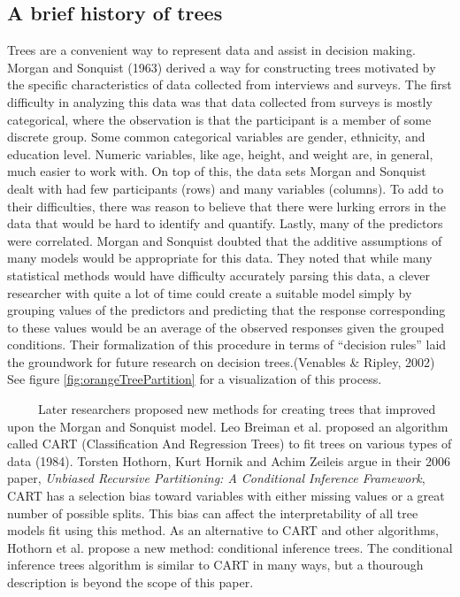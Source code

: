 \documentclass[12pt,twoside]{reedthesis}
\begin{document}
  \subsection{A brief history of trees}\label{a-brief-history-of-trees}
  
  Trees are a convenient way to represent data and assist in decision
  making. Morgan and Sonquist (1963) derived a way for constructing trees
  motivated by the specific characteristics of data collected from
  interviews and surveys. The first difficulty in analyzing this data was
  that data collected from surveys is mostly categorical, where the
  observation is that the participant is a member of some discrete group.
  Some common categorical variables are gender, ethnicity, and education
  level. Numeric variables, like age, height, and weight are, in general,
  much easier to work with. On top of this, the data sets Morgan and
  Sonquist dealt with had few participants (rows) and many variables
  (columns). To add to their difficulties, there was reason to believe
  that there were lurking errors in the data that would be hard to
  identify and quantify. Lastly, many of the predictors were correlated.
  Morgan and Sonquist doubted that the additive assumptions of many models
  would be appropriate for this data. They noted that while many
  statistical methods would have difficulty accurately parsing this data,
  a clever researcher with quite a lot of time could create a suitable
  model simply by grouping values of the predictors and predicting that
  the response corresponding to these values would be an average of the
  observed responses given the grouped conditions. Their formalization of
  this procedure in terms of ``decision rules'' laid the groundwork for
  future research on decision trees.(Venables \& Ripley, 2002) See figure
  \ref{fig:orangeTreePartition} for a visualization of this process.
  
  ~~~~~Later researchers proposed new methods for creating trees that
  improved upon the Morgan and Sonquist model. Leo Breiman et al. proposed
  an algorithm called CART (Classification And Regression Trees) to fit
  trees on various types of data (1984). Torsten Hothorn, Kurt Hornik and
  Achim Zeileis argue in their 2006 paper, \emph{Unbiased Recursive
  Partitioning: A Conditional Inference Framework}, CART has a selection
  bias toward variables with either missing values or a great number of
  possible splits. This bias can affect the interpretability of all tree
  models fit using this method. As an alternative to CART and other
  algorithms, Hothorn et al. propose a new method: conditional inference
  trees. The conditional inference trees algorithm is similar to CART in
  many ways, but a thourough description is beyond the scope of this
  paper.
  
\end{document}
